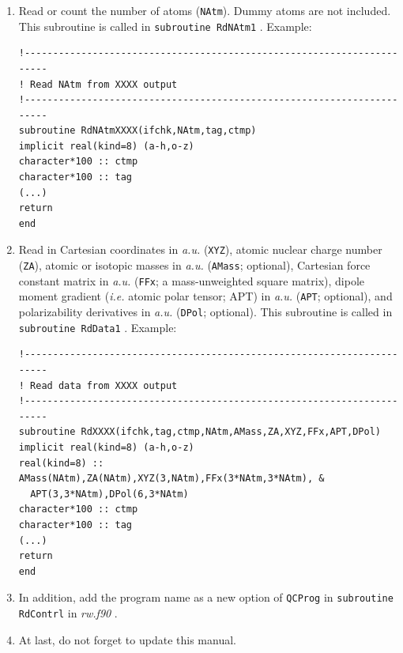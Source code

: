 \documentclass[12pt,english]{extarticle}
\begin{document}
\begin{enumerate}
\item Read or count the number of atoms (\verb|NAtm|). Dummy atoms are not included. This subroutine is called in \verb|subroutine RdNAtm1| . Example:
\begin{lstlisting}[language={[90]Fortran}]
!-----------------------------------------------------------------------
! Read NAtm from XXXX output
!-----------------------------------------------------------------------
subroutine RdNAtmXXXX(ifchk,NAtm,tag,ctmp)
implicit real(kind=8) (a-h,o-z)
character*100 :: ctmp
character*100 :: tag
(...)
return
end
\end{lstlisting}

\item Read in Cartesian coordinates in \emph{a.u.} (\verb|XYZ|), atomic nuclear charge number (\verb|ZA|), atomic or isotopic masses in \emph{a.u.} (\verb|AMass|; optional), Cartesian force constant matrix in \emph{a.u.}
(\verb|FFx|; a mass-unweighted square matrix), dipole moment gradient (\emph{i.e.} atomic polar tensor; APT) in \emph{a.u.}
(\verb|APT|; optional), and polarizability derivatives in \emph{a.u.}
(\verb|DPol|; optional). This subroutine is called in \verb|subroutine RdData1| . Example:
\begin{lstlisting}[language={[90]Fortran}]
!-----------------------------------------------------------------------
! Read data from XXXX output
!-----------------------------------------------------------------------
subroutine RdXXXX(ifchk,tag,ctmp,NAtm,AMass,ZA,XYZ,FFx,APT,DPol)
implicit real(kind=8) (a-h,o-z)
real(kind=8) :: AMass(NAtm),ZA(NAtm),XYZ(3,NAtm),FFx(3*NAtm,3*NAtm), &
  APT(3,3*NAtm),DPol(6,3*NAtm)
character*100 :: ctmp
character*100 :: tag
(...)
return
end
\end{lstlisting}

\item In addition, add the program name as a new option of \verb|QCProg| in \verb|subroutine RdContrl| in \emph{rw.f90} .

\item At last, do not forget to update this manual.
\end{enumerate}

\pagebreak{}

{}
\printindex
\end{document}

